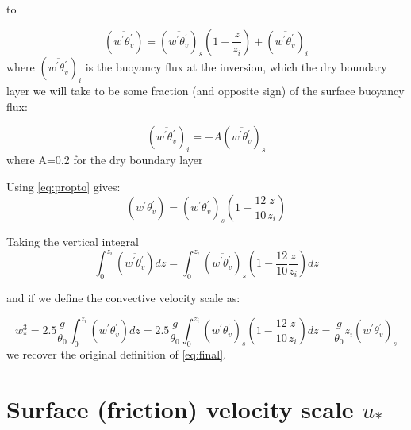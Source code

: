 \documentclass[12pt]{article}
\begin{document}
to

\begin{equation}
  \label{eq:linearent}
 \left (\overline{ w^\prime \theta_v^\prime } \right ) =  \left (\overline{ w^\prime \theta_v^\prime } \right )_s  \left (    1 - \frac{ z}{z_i}  \right )
  + \left (\overline{ w^\prime \theta_v^\prime } \right )_i  
\end{equation}
where $\left (\overline{ w^\prime \theta_v^\prime } \right )_i$ is the buoyancy flux at the inversion, which the dry boundary layer
we will take to be some fraction (and opposite sign) of the  surface buoyancy flux:

\begin{equation}
  \label{eq:propto}
  (\overline{ w^\prime \theta_v^\prime })_i = -A (\overline{ w^\prime \theta_v^\prime })_s
\end{equation}
where A=0.2 for the dry boundary layer

Using \eqref{eq:propto} gives:
\begin{equation}
  \label{eq:linear2}
 \left (\overline{ w^\prime \theta_v^\prime } \right ) =  \left (\overline{ w^\prime \theta_v^\prime } \right )_s  \left (    1 - \frac{12}{10}\frac{ z}{z_i}  \right )
\end{equation}

Taking the vertical integral
\begin{equation}
  \label{eq:linear3}
\int_0^{z_i} \left (\overline{ w^\prime \theta_v^\prime } \right ) dz =  
\int_0^{z_i} \left (\overline{ w^\prime \theta_v^\prime } \right )_s  \left (    1 - \frac{12}{10}\frac{ z}{z_i}  \right )dz
\end{equation}

and if we define the convective velocity scale as:

\begin{equation}
  \label{eq:convent}
  w_*^3 =  2.5 \frac{g}{\theta_0} \int_0^{z_i} \left (\overline{ w^\prime \theta_v^\prime } \right ) dz =  
2.5 \frac{g}{\theta_0} \int_0^{z_i} \left (\overline{ w^\prime \theta_v^\prime } \right )_s  \left (    1 - \frac{12}{10}\frac{ z}{z_i}  \right )dz
= \frac{g}{\theta_0} z_i \left ( \overline{ w^\prime \theta_v^\prime } \right )_s
\end{equation}
we recover the original definition of \eqref{eq:final}.


\section{Surface (friction) velocity scale $u_*$}
\label{sec:surf-frict-veloc}
\end{document}
